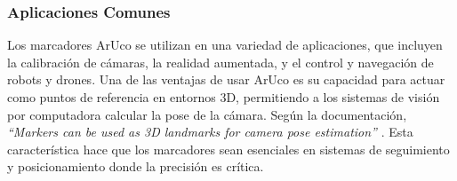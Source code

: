     \subsubsection{Aplicaciones Comunes}

    Los marcadores ArUco se utilizan en una variedad de aplicaciones, que incluyen la calibración de cámaras, la realidad aumentada, y el control y navegación de robots y drones. Una de las ventajas de usar ArUco es su capacidad para actuar como puntos de referencia en entornos 3D, permitiendo a los sistemas de visión por computadora calcular la pose de la cámara. Según la documentación, \textit{“Markers can be used as 3D landmarks for camera pose estimation”} \cite{aruco_docs_pdf}. Esta característica hace que los marcadores sean esenciales en sistemas de seguimiento y posicionamiento donde la precisión es crítica.

